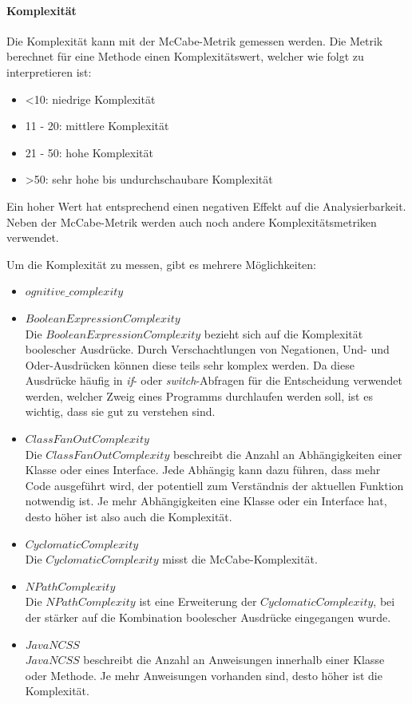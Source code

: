 \documentclass[
	oneside,  %
	ngerman, 
	final, 
	11pt, 
	a4paper, 
	1.1headlines, 
	headinclude=false, 
	footinclude=false, 
	mpinclude=false, 
	pagesize, 
	onecolumn, 
	titlepage, 
	parskip=half, 
	headsepline, 
	chapterprefix=false, 
	version=first, 
	listof=totoc, 
	bibliography=totoc, 
	toc=graduated, 
	fleqn
]{scrbook}
\begin{document}
\paragraph{Komplexität}
Die Komplexität kann mit der McCabe-Metrik gemessen werden.
Die Metrik berechnet für eine Methode einen Komplexitätswert, welcher wie folgt zu interpretieren ist:

\begin{itemize}
	\item <10: niedrige Komplexität
	\item 11 - 20: mittlere Komplexität
	\item 21 - 50: hohe Komplexität
	\item >50: sehr hohe bis undurchschaubare Komplexität
\end{itemize}

Ein hoher Wert hat entsprechend einen negativen Effekt auf die Analysierbarkeit.
Neben der McCabe-Metrik werden auch noch andere Komplexitätsmetriken verwendet.

Um die Komplexität zu messen, gibt es mehrere Möglichkeiten:

\begin{itemize}
	\item $ognitive\_complexity$
	\item $BooleanExpressionComplexity$\\
	Die $BooleanExpressionComplexity$ bezieht sich auf die Komplexität boolescher Ausdrücke.
	Durch Verschachtlungen von Negationen, Und- und Oder-Ausdrücken können diese teils sehr komplex werden.
	Da diese Ausdrücke häufig in \textit{if}- oder \textit{switch}-Abfragen für die Entscheidung verwendet werden, welcher Zweig eines Programms durchlaufen werden soll, ist es wichtig, dass sie gut zu verstehen sind.
	\item $ClassFanOutComplexity$\\
	Die $ClassFanOutComplexity$ beschreibt die Anzahl an Abhängigkeiten einer Klasse oder eines Interface.
	Jede Abhängig kann dazu führen, dass mehr Code ausgeführt wird, der potentiell zum Verständnis der aktuellen Funktion notwendig ist.
	Je mehr Abhängigkeiten eine Klasse oder ein Interface hat, desto höher ist also auch die Komplexität.
	\item $CyclomaticComplexity$\\
	Die $CyclomaticComplexity$ misst die McCabe-Komplexität.
	\item $NPathComplexity$\\
	Die $NPathComplexity$ ist eine Erweiterung der $CyclomaticComplexity$, bei der stärker auf die Kombination boolescher Ausdrücke eingegangen wurde.
	\item $JavaNCSS$\\
	$JavaNCSS$ beschreibt die Anzahl an Anweisungen innerhalb einer Klasse oder Methode.
	Je mehr Anweisungen vorhanden sind, desto höher ist die Komplexität.
\end{itemize}
\end{document}
